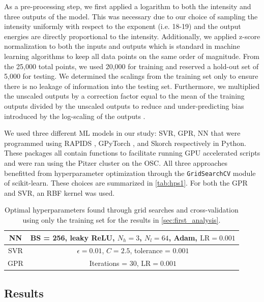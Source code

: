 As a pre-processing step, we first applied a logarithm to both the intensity and three outputs of the model. This was necessary due to our choice of sampling the intensity uniformly with respect to the exponent (i.e. 18-19) and the output energies are directly proportional to the intensity. Additionally, we applied z-score normalization to both the inputs and outputs which is standard in machine learning algorithms to keep all data points on the same order of magnitude. From the 25,000 total points, we used 20,000 for training and reserved a hold-out set of 5,000 for testing. We determined the scalings from the training set only to ensure there is no leakage of information into the testing set. Furthermore, we multiplied the unscaled outputs by a correction factor equal to the mean of the training outputs divided by the unscaled outputs to reduce and under-predicting bias introduced by the log-scaling of the outputs \cite{Miller_1984_AmStat}.

We used three different \gls{ML} models in our study: \gls{SVR}, \gls{GPR}, \gls{NN} that were programmed using RAPIDS \cite{2023_RAPIDS}, GPyTorch \cite{Gardner_2018_GPytorch}, and Skorch \cite{Tietz_2017_Skorch} respectively in Python. These packages all contain functions to facilitate running \gls{GPU} accelerated scripts and were ran using the Pitzer cluster on the \gls{OSC}. All three approaches benefitted from hyperparameter optimization through the \texttt{GridSearchCV} module of scikit-learn. These choices are summarized in \autoref{tab:hps1}. For both the \gls{GPR} and \gls{SVR}, an \gls{RBF} kernel was used.

\begin{table}
	\centering
	\begin{tabular}{|c|c|}
			\hline
			NN & BS = 256, leaky ReLU, $N_h = 3$, $N_l = 64$, Adam, $\text{LR}=0.001$ \\
			\hline
			SVR & $\epsilon = 0.01$, $C = 2.5$, tolerance = $0.001$ \\
			\hline
			GPR & Iterations = 30, $\text{LR}=0.001$ \\
			\hline
	\end{tabular}
	\caption{Optimal hyperparameters found through grid searches and cross-validation using only the training set for the results in \autoref{sec:first_analysis}.}
	\label{tab:hps1}
\end{table}

\subsection{Results}

